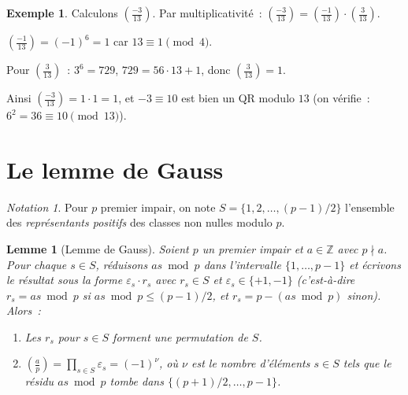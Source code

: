 \documentclass[12pt,a4paper,openany]{book}
\theoremstyle{definition}
\newtheorem{exemple}[definition]{Exemple}
\theoremstyle{plain}
\newtheorem{lemme}[definition]{Lemme}
\theoremstyle{remark}
\newtheorem{notation}[definition]{Notation}
\newcommand{\Z}{\mathbb{Z}}
\newcommand{\legendre}[2]{\left(\frac{#1}{#2}\right)}
\begin{document}
\begin{exemple}
\label{ex:legendre-calculs}
Calculons $\legendre{-3}{13}$.
Par multiplicativité~: $\legendre{-3}{13} = \legendre{-1}{13} \cdot \legendre{3}{13}$.

$\legendre{-1}{13} = (-1)^{6} = 1$ car $13 \equiv 1 \pmod{4}$.

Pour $\legendre{3}{13}$~: $3^6 = 729$, $729 = 56 \cdot 13 + 1$, donc
$\legendre{3}{13} = 1$.

Ainsi $\legendre{-3}{13} = 1 \cdot 1 = 1$, et $-3 \equiv 10$ est bien un
QR modulo $13$ (on vérifie~: $6^2 = 36 \equiv 10 \pmod{13}$). \checkmark
\end{exemple}

\section{Le lemme de Gauss}
\label{sec:qr:gauss-lemma}

\begin{notation}
\label{not:representants}
Pour $p$ premier impair, on note
$S = \{1, 2, \ldots, (p-1)/2\}$ l'ensemble des \emph{représentants positifs}
des classes non nulles modulo $p$.
\end{notation}

\begin{lemme}[Lemme de Gauss]
\label{lem:gauss}
Soient $p$ un premier impair et $a \in \Z$ avec $p \nmid a$. Pour chaque
$s \in S$, réduisons $as \bmod p$ dans l'intervalle $\{1, \ldots, p-1\}$
et écrivons le résultat sous la forme $\varepsilon_s \cdot r_s$ avec
$r_s \in S$ et $\varepsilon_s \in \{+1, -1\}$ (c'est-à-dire $r_s = as \bmod p$
si $as \bmod p \leq (p-1)/2$, et $r_s = p - (as \bmod p)$ sinon). Alors~:
\begin{enumerate}[label=(\alph*)]
  \item Les $r_s$ pour $s \in S$ forment une permutation de $S$.
  \item $\legendre{a}{p} = \prod_{s \in S} \varepsilon_s = (-1)^\nu$,
        où $\nu$ est le nombre d'éléments $s \in S$ tels que le résidu
        $as \bmod p$ tombe dans $\{(p+1)/2, \ldots, p-1\}$.
\end{enumerate}
\end{lemme}
\end{document}
